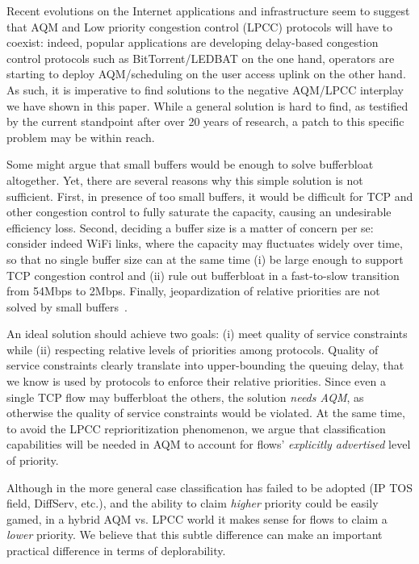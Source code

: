 \documentclass[conference]{IEEEtran}
\begin{document}
Recent evolutions on the Internet applications and infrastructure seem to suggest that AQM and Low priority congestion control (LPCC) protocols will have to coexist: indeed, popular applications are developing delay-based congestion control protocols such as BitTorrent/LEDBAT on the one hand, operators are starting to deploy AQM/scheduling on the user access uplink on the other hand. As such, it is imperative to find solutions to the negative AQM/LPCC interplay we have shown in this paper. While a general solution is hard to find, as testified by the current standpoint after over 20 years of research, a patch to this specific problem may be within reach.

Some might argue that small buffers would be enough to solve bufferbloat altogether. Yet, there are several reasons why this simple solution is not sufficient. First, in presence of too small buffers, it would be difficult for TCP and other congestion control to fully saturate the capacity, causing an undesirable efficiency loss. Second, deciding a buffer size is a matter of concern per se: consider indeed WiFi links, where the capacity may fluctuates widely over time, so that no single buffer size can at the same time (i) be large enough to support TCP congestion control and (ii) rule out bufferbloat in a fast-to-slow transition from 54Mbps to 2Mbps. Finally, jeopardization of relative priorities are not solved by small buffers~\cite{tma13}.

An ideal solution should achieve two goals: (i) meet quality of service constraints while (ii) respecting relative levels of priorities among protocols. Quality of service constraints clearly translate into upper-bounding the queuing delay, that we know is used by protocols to enforce their relative priorities. 
Since even a single TCP flow may bufferbloat the others, the solution \emph{needs AQM}, as otherwise the quality of service constraints would be violated. At the same time, to avoid the LPCC reprioritization phenomenon, we argue that classification capabilities will be needed in AQM to account for flows' \emph{explicitly advertised} level of priority. 

Although in the more general case classification has failed to be adopted (IP TOS field, DiffServ, etc.), and the ability to claim \emph{higher} priority could be easily gamed, in a hybrid AQM vs. LPCC world it makes sense for flows to claim a \emph{lower} priority. We believe that this subtle difference can make an important practical difference in terms of deplorability.
\end{document}
